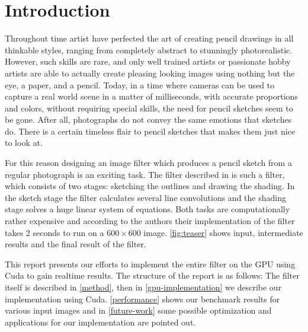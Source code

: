 \section{Introduction}
Throughout time artist have perfected the art of creating pencil drawings in all
thinkable styles, ranging from completely abstract to stunningly photorealistic.
However, such skills are rare, and only well trained artists or passionate hobby
artists are able to actually create pleasing looking images using nothing but
the eye, a paper, and a pencil. Today, in a time where cameras can be used to
capture a real world scene in a matter of milliseconds, with accurate proportions and
colors, without requiring special skills, the need for pencil sketches seem to be gone.
After all, photographs do not convey the same emotions that sketches do. There is a certain
timeless flair to pencil sketches that makes them just nice to look at.

For this reason designing an image filter which produces a pencil sketch from
a regular photograph is an exciting task. The filter described in
\cite{mainPaper} is such a filter, which consists of two stages: sketching the
outlines and drawing the shading. In the sketch stage the filter calculates several
line convolutions and the shading stage solves a huge linear system of
equations. Both tasks are computationally rather expensive and according to the
authors their implementation of the filter takes 2 seconds to run on a
$600\times 600$ image. \autoref{fig:teaser} shows input, intermediate
results and the final result of the filter.

This report presents our efforts to implement the entire filter on the GPU using
Cuda to gain realtime results. The structure of the report is as follows: The
filter itself is described in \autoref{method}, then in
\autoref{gpu-implementation} we describe our implementation using Cuda.
\autoref{performance} shows our benchmark results for various input images
and in \autoref{future-work} some possible optimization and applications for our
implementation are pointed out.
